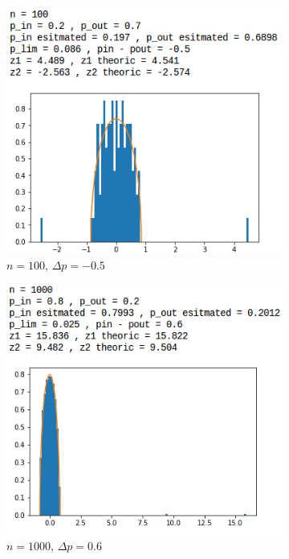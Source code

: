 \begin{figure}[p]
\begin{subfigure}{.5\textwidth}
		\centering
		\includegraphics[scale=0.58]{static/spectral_n100_pin02_pout07.png}
		\caption{$n=100$, $\Delta p=-0.5$}
		\label{n100delta-05}
	\end{subfigure}
	\begin{subfigure}{.5\textwidth}
		\centering
		\includegraphics[scale=0.58]{static/spectral_n1000_pin08_pout02.png}
		\caption{$n=1000$, $\Delta p=0.6$}
		\label{n1000delta05}
	\end{subfigure}
	\begin{subfigure}{.5\textwidth}
		\centering

\end{subfigure}
\end{figure}
